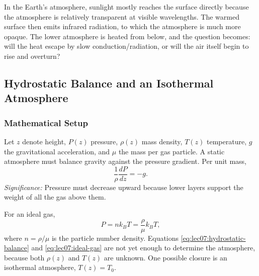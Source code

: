 In the Earth's atmosphere, sunlight mostly reaches the surface directly because
the atmosphere is relatively transparent at visible wavelengths. The warmed
surface then emits infrared radiation, to which the atmosphere is much more
opaque. The lower atmosphere is heated from below, and the question becomes:
will the heat escape by slow conduction/radiation, or will the air itself begin
to rise and overturn?


\subsection{Hydrostatic Balance and an Isothermal Atmosphere}
\label{sec:lec07:hydrostatic-isothermal}

\subsubsection*{Mathematical Setup}
Let $z$ denote height, $P(z)$ pressure, $\rho(z)$ mass density, $T(z)$
temperature, $g$ the gravitational acceleration, and $\mu$ the mass per gas
particle. A static atmosphere must balance gravity against the pressure
gradient. Per unit mass,
\begin{equation}
    \boxed{
    \frac{1}{\rho}\frac{dP}{dz} = -g .
    }
    \label{eq:lec07:hydrostatic-balance}
\end{equation}
\textit{Significance:} Pressure must decrease upward because lower layers
support the weight of all the gas above them.

For an ideal gas,
\begin{equation}
    P = n k_B T = \frac{\rho}{\mu}k_B T ,
    \label{eq:lec07:ideal-gas}
\end{equation}
where $n=\rho/\mu$ is the particle number density. Equations
\eqref{eq:lec07:hydrostatic-balance} and \eqref{eq:lec07:ideal-gas} are not
yet enough to determine the atmosphere, because both $\rho(z)$ and $T(z)$ are
unknown. One possible closure is an isothermal atmosphere, $T(z)=T_0$.

